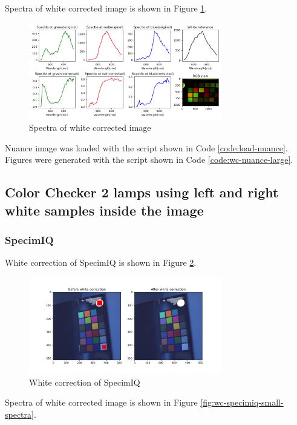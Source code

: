Spectra of white corrected image is shown in Figure
\ref{fig:wc-nuance-camera-large-spectra}.

\begin{figure}[H]
  \centering
  \caption{Spectra of white corrected image}
  \label{fig:wc-nuance-camera-large-spectra}
  \includegraphics[width=0.75\textwidth]{
    ./fig-task1/wc-nuance-spectra-large.png
  }
\end{figure}

Nuance image was loaded with the script shown in Code \ref{code:load-nuance}.
Figures were generated with the script shown in Code \ref{code:wc-nuance-large}.

\subsection{Color Checker 2 lamps using left and right white samples
inside the image}

\subsubsection{SpecimIQ}
White correction of SpecimIQ is shown in Figure \ref{fig:wc-specimiq-small}.

\begin{figure}[H]
  \centering
  \caption{White correction of SpecimIQ}
  \label{fig:wc-specimiq-small}
  \includegraphics[width=0.75\textwidth]{./fig-task1/wc-specimiq-small.png}
\end{figure}

Spectra of white corrected image is shown in Figure
\ref{fig:wc-specimiq-small-spectra}.

